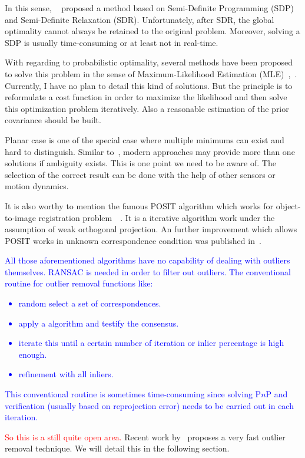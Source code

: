 \documentclass[a4paper]{article}
\begin{document}
In this sense, ~\cite{schweighofer2008globally} proposed a method based on Semi-Definite Programming (SDP) and Semi-Definite Relaxation (SDR). Unfortunately, after SDR, the global optimality cannot always be retained to the original problem. Moreover, solving a SDP is usually time-consuming or at least not in real-time.

With regarding to probabilistic optimality, several methods have been proposed to solve this problem in the sense of Maximum-Likelihood Estimation (MLE)~\cite{ferraz2014leveraging},~\cite{urban2016mlpnp}. Currently, I have no plan to detail this kind of solutions. But the principle is to reformulate a cost function in order to maximize the likelihood and then solve this optimization problem iteratively. Also a reasonable estimation of the prior covariance should be built.

Planar case is one of the special case where multiple minimums can exist and hard to distinguish. Similar to~\cite{rpp}, modern approaches may provide more than one solutions if ambiguity exists. This is one point we need to be aware of. The selection of the correct result can be done with the help of other sensors or motion dynamics.

It is also worthy to mention the famous POSIT algorithm which works for object-to-image registration problem~\cite{dementhon1995model}~\cite{oberkampf1996iterative}. It is a iterative algorithm work under the assumption of weak orthogonal projection. An further improvement which allows POSIT works in unknown correspondence condition was published in~\cite{softposit}.

\textcolor{blue}{All those aforementioned algorithms have no capability of dealing with outliers themselves. RANSAC is needed in order to filter out outliers. The conventional routine for outlier removal functions like: 
\begin{itemize}
\item random select a set of correspondences.
\item apply a algorithm and testify the consensus.
\item iterate this until a certain number of iteration or inlier percentage is high enough.
\item refinement with all inliers.
\end{itemize}
This conventional routine is sometimes time-consuming since solving P$n$P and verification (usually based on reprojection error) needs to be carried out in each iteration.}
\textcolor{red}{So this is a still quite open area.} Recent work by~\cite{ferraz2014very} proposes a very fast outlier removal technique. We will detail this in the following section.
\end{document}
